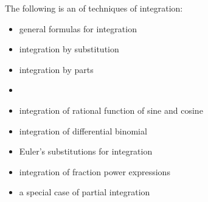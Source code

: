 \documentclass[12pt]{article}
\begin{document}
The following is an  of techniques of integration:

\begin{itemize}
\item general formulas for integration
\item integration by substitution
\item integration by parts
\item {}
\item integration of rational function of sine and cosine
\item integration of differential binomial
\item Euler's substitutions for integration
\item integration of fraction power expressions
\item a special case of partial integration
\end{itemize}
\end{document}
